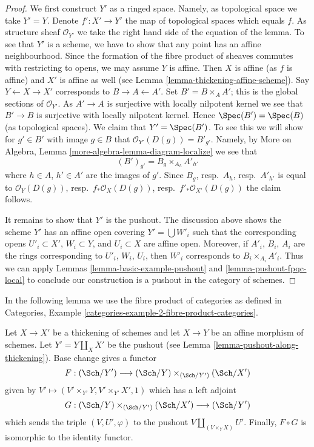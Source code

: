 \begin{proof}
We first construct $Y'$ as a ringed space. Namely, as topological
space we take $Y' = Y$. Denote $f' : X' \to Y'$ the map of topological
spaces which equals $f$. As structure sheaf $\mathcal{O}_{Y'}$ we take
the right hand side of the equation of the lemma. To see that
$Y'$ is a scheme, we have to show that any point has an affine
neighbourhood. Since the formation of the fibre product of sheaves
commutes with restricting to opens, we may assume $Y$ is affine.
Then $X$ is affine (as $f$ is affine) and $X'$ is affine as well
(see Lemma \ref{lemma-thickening-affine-scheme}).
Say $Y \leftarrow X \rightarrow X'$ corresponds
to $B \rightarrow A \leftarrow A'$. Set $B' = B \times_A A'$; this
is the global sections of $\mathcal{O}_{Y'}$. As $A' \to A$ is surjective
with locally nilpotent kernel we see that $B' \to B$ is surjective
with locally nilpotent kernel. Hence $\Spec(B') = \Spec(B)$ (as
topological spaces). We claim that $Y' = \Spec(B')$. To see this
we will show for $g' \in B'$ with image $g \in B$ that
$\mathcal{O}_{Y'}(D(g)) = B'_{g'}$. Namely, by
More on Algebra, Lemma \ref{more-algebra-lemma-diagram-localize} we see that
$$
(B')_{g'} = B_g \times_{A_h} A'_{h'}
$$
where $h \in A$, $h' \in A'$ are the images of $g'$. Since
$B_g$, resp.\ $A_h$, resp.\ $A'_{h'}$ is equal to $\mathcal{O}_Y(D(g))$,
resp.\ $f_*\mathcal{O}_X(D(g))$, resp.\ $f'_*\mathcal{O}_{X'}(D(g))$ the
claim follows.

\medskip\noindent
It remains to show that $Y'$ is the pushout.
The discussion above shows the scheme $Y'$
has an affine open covering $Y' = \bigcup W'_i$
such that the corresponding opens
$U'_i \subset X'$, $W_i \subset Y$, and
$U_i \subset X$ are affine open.
Moreover, if $A'_i$, $B_i$, $A_i$ are the rings corresponding to
$U'_i$, $W_i$, $U_i$, then
$W'_i$ corresponds to $B_i \times_{A_i} A'_i$.
Thus we can apply Lemmas \ref{lemma-basic-example-pushout} and
\ref{lemma-pushout-fpqc-local} to conclude our construction is a pushout
in the category of schemes.
\end{proof}

\noindent
In the following lemma we use the fibre product of categories as
defined in
Categories, Example \ref{categories-example-2-fibre-product-categories}.

\begin{lemma}
\label{lemma-equivalence-categories-schemes-over-pushout}
Let $X \to X'$ be a thickening of schemes and let $X \to Y$ be an
affine morphism of schemes. Let $Y' = Y \amalg_X X'$ be the pushout
(see Lemma \ref{lemma-pushout-along-thickening}). Base change gives
a functor
$$
F : (\Sch/Y') \longrightarrow (\Sch/Y) \times_{(\Sch/Y')} (\Sch/X')
$$
given by $V' \longmapsto (V' \times_{Y'} Y, V' \times_{Y'} X', 1)$
which has a left adjoint
$$
G : (\Sch/Y) \times_{(\Sch/Y')} (\Sch/X') \longrightarrow (\Sch/Y')
$$
which sends the triple $(V, U', \varphi)$ to the pushout
$V \amalg_{(V \times_Y X)} U'$. Finally, $F \circ G$ is isomorphic to the
identity functor.
\end{lemma}

